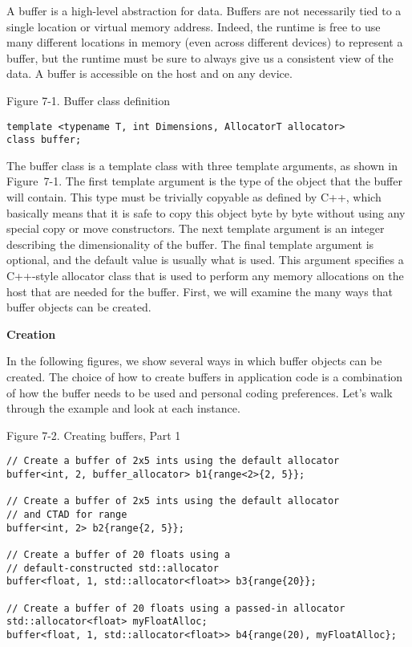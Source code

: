 A buffer is a high-level abstraction for data. Buffers are not necessarily tied to a single location or virtual memory address. Indeed, the runtime is free to use many different locations in memory (even across different devices) to represent a buffer, but the runtime must be sure to always give us a consistent view of the data. A buffer is accessible on the host and on any device.\par

\hspace*{\fill} \par %
Figure 7-1. Buffer class definition
\begin{lstlisting}[caption={}]
template <typename T, int Dimensions, AllocatorT allocator>
class buffer;
\end{lstlisting}

The buffer class is a template class with three template arguments, as shown in Figure 7-1. The first template argument is the type of the object that the buffer will contain. This type must be trivially copyable as defined by C++, which basically means that it is safe to copy this object byte by byte without using any special copy or move constructors. The next template argument is an integer describing the dimensionality of the buffer. The final template argument is optional, and the default value is usually what is used. This argument specifies a C++-style allocator class that is used to perform any memory allocations on the host that are needed for the buffer. First, we will examine the many ways that buffer objects can be created.\par

\hspace*{\fill} \par %
\textbf{Creation}

In the following figures, we show several ways in which buffer objects can be created. The choice of how to create buffers in application code is a combination of how the buffer needs to be used and personal coding preferences. Let’s walk through the example and look at each instance.\par

\hspace*{\fill} \par %
Figure 7-2. Creating buffers, Part 1
\begin{lstlisting}[caption={}]
// Create a buffer of 2x5 ints using the default allocator
buffer<int, 2, buffer_allocator> b1{range<2>{2, 5}};

// Create a buffer of 2x5 ints using the default allocator 
// and CTAD for range
buffer<int, 2> b2{range{2, 5}};

// Create a buffer of 20 floats using a 
// default-constructed std::allocator
buffer<float, 1, std::allocator<float>> b3{range{20}};

// Create a buffer of 20 floats using a passed-in allocator
std::allocator<float> myFloatAlloc;
buffer<float, 1, std::allocator<float>> b4{range(20), myFloatAlloc};
\end{lstlisting}

